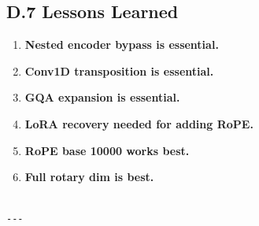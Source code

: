 \subsection{D.7 Lessons Learned}

\begin{enumerate}
\item \textbf{Nested encoder bypass is essential.}
\item \textbf{Conv1D transposition is essential.}
\item \textbf{GQA expansion is essential.}
\item \textbf{LoRA recovery needed for adding RoPE.}
\item \textbf{RoPE base 10000 works best.}
\item \textbf{Full rotary dim is best.}
\end{enumerate}
\begin{lstlisting}

---
\end{lstlisting}